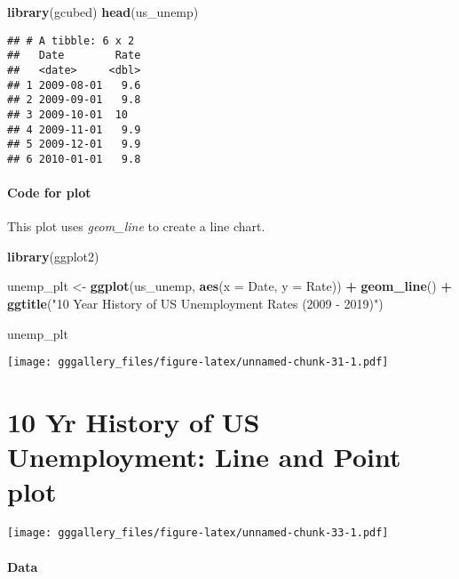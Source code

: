 \documentclass[]{book}
\newenvironment{Shaded}{\begin{snugshade}}{\end{snugshade}}
\newcommand{\DataTypeTok}[1]{\textcolor[rgb]{0.13,0.29,0.53}{#1}}
\newcommand{\KeywordTok}[1]{\textcolor[rgb]{0.13,0.29,0.53}{\textbf{#1}}}
\newcommand{\NormalTok}[1]{#1}
\newcommand{\OperatorTok}[1]{\textcolor[rgb]{0.81,0.36,0.00}{\textbf{#1}}}
\newcommand{\StringTok}[1]{\textcolor[rgb]{0.31,0.60,0.02}{#1}}
\begin{document}
\begin{Shaded}
\begin{Highlighting}[]
\KeywordTok{library}\NormalTok{(gcubed)}
\KeywordTok{head}\NormalTok{(us_unemp)}
\end{Highlighting}
\end{Shaded}

\begin{verbatim}
## # A tibble: 6 x 2
##   Date        Rate
##   <date>     <dbl>
## 1 2009-08-01   9.6
## 2 2009-09-01   9.8
## 3 2009-10-01  10  
## 4 2009-11-01   9.9
## 5 2009-12-01   9.9
## 6 2010-01-01   9.8
\end{verbatim}

\hypertarget{unempcode}{%
\subsubsection*{Code for plot}\label{unempcode}}

This plot uses \emph{geom\_line} to create a line chart.

\begin{Shaded}
\begin{Highlighting}[]
\KeywordTok{library}\NormalTok{(ggplot2)}

\NormalTok{unemp_plt <-}\StringTok{ }\KeywordTok{ggplot}\NormalTok{(us_unemp, }\KeywordTok{aes}\NormalTok{(}\DataTypeTok{x =}\NormalTok{ Date, }\DataTypeTok{y =}\NormalTok{ Rate)) }\OperatorTok{+}\StringTok{ }
\StringTok{  }\KeywordTok{geom_line}\NormalTok{() }\OperatorTok{+}\StringTok{ }
\StringTok{  }\KeywordTok{ggtitle}\NormalTok{(}\StringTok{"10 Year History of US Unemployment Rates (2009 - 2019)"}\NormalTok{)}

\NormalTok{unemp_plt}
\end{Highlighting}
\end{Shaded}

\texttt{[image: gggallery\_files/figure-latex/unnamed-chunk-31-1.pdf]}

\hypertarget{unempp}{%
\chapter*{10 Yr History of US Unemployment: Line and Point plot}\label{unempp}}

\texttt{[image: gggallery\_files/figure-latex/unnamed-chunk-33-1.pdf]}

\hypertarget{unemppdata}{%
\subsubsection*{Data}\label{unemppdata}}
\end{document}
